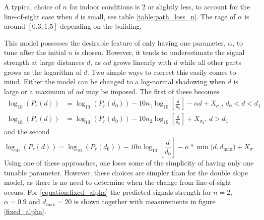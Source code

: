 \documentclass{LTHthesis}
\begin{document}
A typical choice of $n$ for indoor conditions is 2 or slightly less, to account for the line-of-sight case when $d$ is small, see table \ref{table:path_loss_n}. The rage of $\alpha$ is around $[0.3,1.5]$ depending on the building.

This model possesses the desirable feature of only having one parameter, $\alpha$, to tune after the initial $n$ is chosen. However, it tends to underestimate the signal strength at large distances $d$, as $\alpha d$ grows linearly with $d$ while all other parts grows as the logarithm of $d$. Two simple ways to correct this easily comes to mind. Either the model can be changed to a log-normal shadowing when $d$ is large or a maximum of $\alpha d $ may be imposed. The first of these becomes     
%
\begin{subequations}
\begin{align}
\log_{10}({P_r(d)})&=\log_{10}({P_r(d_0)})-10n_1\log_{10}\left[{\frac{d}{d_0}}\right] -\alpha d+ X_{\sigma_1}, \hspace{2pt} d_0<d<d_1\\
\log_{10}({P_r(d)})&=\log_{10}({P_r(d_0)})-10n_2\log_{10}\left[{\frac{d}{d_0}}\right] + X_{\sigma_2}, \hspace{2pt} d>d_1
\end{align}
\end{subequations} 
and the second
\begin{equation}
\log_{10}({P_r(d)})=\log_{10}({P_r(d_0)})-10n\log_{10}\left[{\frac{d}{d_0}}\right] - \alpha*\min({d, d_{\text{max}})}+ X_\sigma.
\label{equation:fixed_alpha}
\end{equation}
%
Using one of these approaches, one loses some of the simplicity of having only one tunable parameter. However, these choices are simpler than for the double slope model, as there is no need to determine when the change from line-of-sight occurs. 
For \ref{equation:fixed_alpha} the predicted signals strength for $n=2$, $\alpha=0.9$ and $d_{\text{max}}=20$ is shown together with measurements in figure \ref{fixed_alpha}. 
\end{document}
